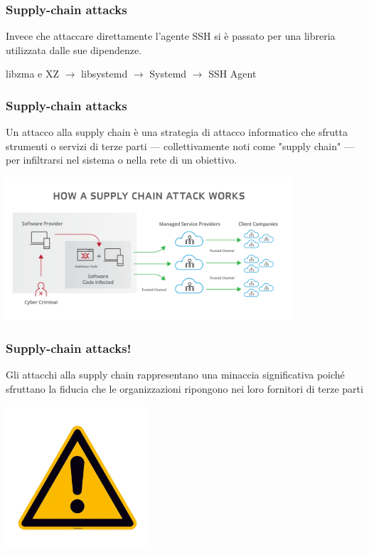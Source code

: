 \begin{frame}
\frametitle{Supply-chain attacks}
Invece che attaccare direttamente l'agente SSH si è passato per una libreria utilizzata dalle sue dipendenze.

\vspace{1 cm}
\centering
    libzma e XZ $\rightarrow$ libsystemd $\rightarrow$ Systemd $\rightarrow$ SSH Agent

\end{frame}

\begin{frame}
\frametitle{Supply-chain attacks}

Un attacco alla supply chain è una strategia di attacco informatico che sfrutta strumenti o servizi di terze parti — collettivamente noti come "supply chain" — per infiltrarsi nel sistema o nella rete di un obiettivo.

\includegraphics[width=0.8\textwidth]{img/2-Introduction/supplychain.png}
\end{frame}


\begin{frame}
\frametitle{Supply-chain attacks!}

Gli attacchi alla supply chain rappresentano una minaccia significativa poiché sfruttano la fiducia che le organizzazioni ripongono nei loro fornitori di terze parti
\begin{center}
  \includegraphics[width=0.4\textwidth]{img/2-Introduction/Warning.jpg}  
\end{center}
    
\end{frame}

